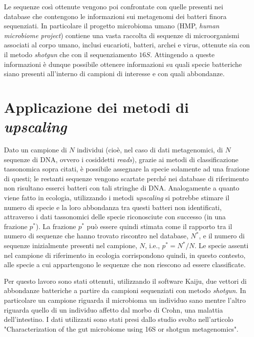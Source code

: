 Le sequenze così ottenute vengono poi confrontate con quelle presenti nei database che contengono le informazioni sui metagenomi dei batteri finora sequenziati. In particolare il progetto microbioma umano (HMP, \emph{human microbiome project}) contiene una vasta raccolta di sequenze di microorganismi associati al corpo umano, inclusi eucarioti, batteri, archei e virus, ottenute sia con il metodo \emph{shotgun} che con il sequenziamento $16S$. Attingendo a queste informazioni è dunque possibile ottenere informazioni su quali specie batteriche siano presenti all'interno di campioni di interesse e con quali abbondanze.



\section{Applicazione dei metodi di \emph{upscaling}}
Dato un campione di $N$ individui (cioè, nel caso di dati metagenomici, di $N$ sequenze di DNA, ovvero i cosiddetti \emph{reads}), grazie ai metodi di classificazione tassonomica sopra citati, è possibile assegnare la specie solamente ad una frazione di questi; le restanti sequenze vengono scartate perché nei database di riferimento non risultano esserci  batteri con tali stringhe di DNA. Analogamente a quanto viene fatto in ecologia, utilizzando i metodi \emph{upscaling} si potrebbe stimare il numero di specie e la loro abbondanza tra questi batteri non identificati, attraverso i dati tassonomici delle specie riconosciute con successo (in una frazione $p^*$). La frazione $p^*$ può essere quindi stimata come il rapporto tra il numero di sequenze che hanno trovato riscontro nel database, $N^*$, e il numero di sequenze inizialmente presenti nel campione, $N$, i.e., $p^*=N^*/N$.  Le specie assenti nel campione di riferimento in ecologia corrispondono quindi, in questo contesto, alle specie a cui appartengono le sequenze che non riescono ad essere classificate.

Per questo lavoro sono stati ottenuti, utilizzando il software Kaiju\cite{Kaiju}, due vettori di abbondanze batteriche a partire da campioni sequenziati con metodo \emph{shotgun}. In particolare un campione riguarda il microbioma un individuo sano mentre l'altro riguarda quello di un individuo affetto dal morbo di Crohn, una malattia dell'intestino. I dati utilizzati sono stati presi dallo studio svolto nell'articolo "Characterization of the gut microbiome using 16S or shotgun metagenomics"\cite{shotgun}. \\

